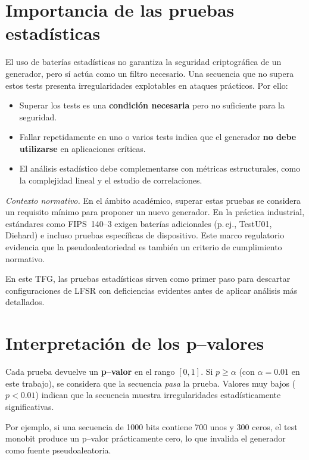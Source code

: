 \section*{Importancia de las pruebas estadísticas}

El uso de baterías estadísticas no garantiza la seguridad criptográfica de un
generador, pero sí actúa como un filtro necesario. Una secuencia que no supera
estos tests presenta irregularidades explotables en ataques prácticos. Por ello:

\begin{itemize}
    \item Superar los tests es una \textbf{condición necesaria} pero no suficiente
    para la seguridad.
    \item Fallar repetidamente en uno o varios tests indica que el generador
    \textbf{no debe utilizarse} en aplicaciones críticas.
    \item El análisis estadístico debe complementarse con métricas estructurales,
    como la complejidad lineal y el estudio de correlaciones.
\end{itemize}

\noindent\textit{Contexto normativo.}
En el ámbito académico, superar estas pruebas se considera un requisito mínimo para proponer un nuevo generador.
En la práctica industrial, estándares como FIPS~140--3 exigen baterías adicionales (p.\,ej., TestU01, Diehard) e incluso pruebas específicas de dispositivo.
Este marco regulatorio evidencia que la pseudoaleatoriedad es también un criterio de cumplimiento normativo.

En este TFG, las pruebas estadísticas sirven como primer paso para descartar
configuraciones de LFSR con deficiencias evidentes antes de aplicar análisis
más detallados.


\section*{Interpretación de los p--valores}

Cada prueba devuelve un \textbf{p--valor} en el rango $[0,1]$. Si $p \geq
\alpha$ (con $\alpha = 0.01$ en este trabajo), se considera que la secuencia
\textit{pasa} la prueba. Valores muy bajos ($p < 0.01$) indican que la secuencia
muestra irregularidades estadísticamente significativas.

Por ejemplo, si una secuencia de 1000 bits contiene 700 unos y 300 ceros, el
test monobit produce un p--valor prácticamente cero, lo que invalida el generador
como fuente pseudoaleatoria.


